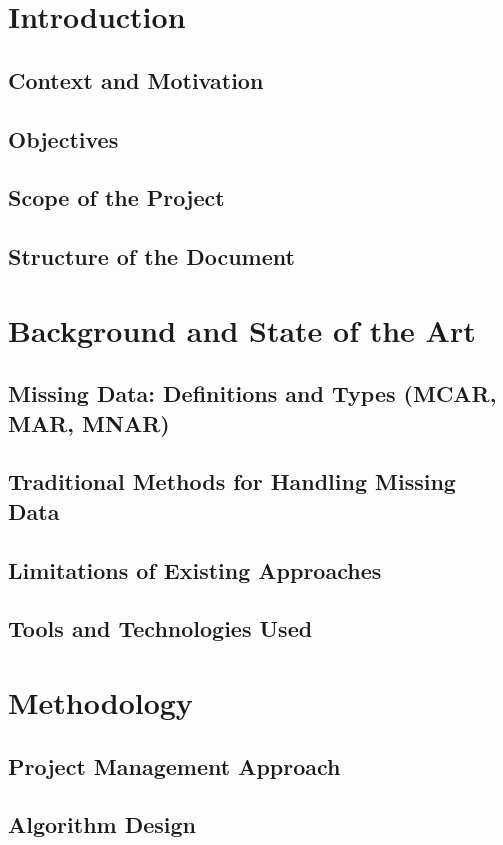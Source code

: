 \documentclass[a4paper,12pt]{article}
\begin{document}
\tableofcontents
\newpage

\section{Introduction}
\subsection{Context and Motivation}
\subsection{Objectives}
\subsection{Scope of the Project}
\subsection{Structure of the Document}

\section{Background and State of the Art}
\subsection{Missing Data: Definitions and Types (MCAR, MAR, MNAR)}
\subsection{Traditional Methods for Handling Missing Data}
\subsection{Limitations of Existing Approaches}
\subsection{Tools and Technologies Used}

\section{Methodology}
\subsection{Project Management Approach}
\subsection{Algorithm Design}
\end{document}
